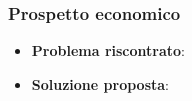 		\subsubsection{Prospetto economico}
			\begin{itemize}
				\item \textbf{Problema riscontrato}:
				\item \textbf{Soluzione proposta}:
			\end{itemize}
		
